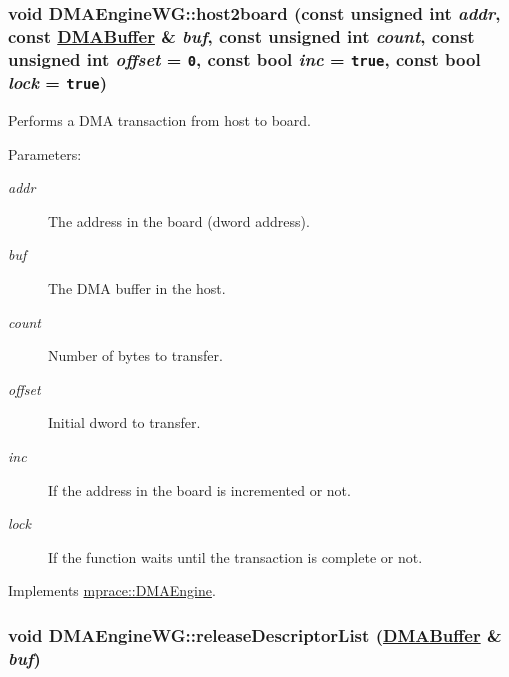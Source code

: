 \hypertarget{classmprace_1_1DMAEngineWG_a4}{
\subsubsection[host2board]{\setlength{\rightskip}{0pt plus 5cm}void DMAEngine\-WG::host2board (const unsigned int {\em addr}, const \hyperlink{classmprace_1_1DMABuffer}{DMABuffer} \& {\em buf}, const unsigned int {\em count}, const unsigned int {\em offset} = {\tt 0}, const bool {\em inc} = {\tt true}, const bool {\em lock} = {\tt true})}}
\label{classmprace_1_1DMAEngineWG_a4}


Performs a DMA transaction from host to board. 

\begin{Desc}
\item[Parameters:]
\begin{description}
\item[{\em addr}]The address in the board (dword address). \item[{\em buf}]The DMA buffer in the host. \item[{\em count}]Number of bytes to transfer. \item[{\em offset}]Initial dword to transfer. \item[{\em inc}]If the address in the board is incremented or not. \item[{\em lock}]If the function waits until the transaction is complete or not.\end{description}
\end{Desc}


Implements \hyperlink{classmprace_1_1DMAEngine_a3}{mprace::DMAEngine}.\hypertarget{classmprace_1_1DMAEngineWG_a7}{
\subsubsection[releaseDescriptorList]{\setlength{\rightskip}{0pt plus 5cm}void DMAEngine\-WG::release\-Descriptor\-List (\hyperlink{classmprace_1_1DMABuffer}{DMABuffer} \& {\em buf})}}
\label{classmprace_1_1DMAEngineWG_a7}


